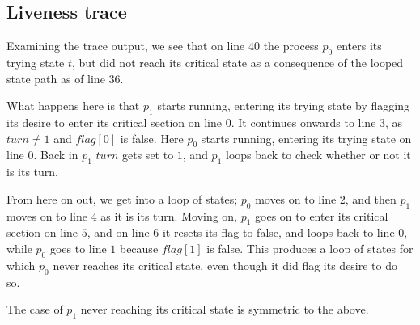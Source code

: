 \documentclass[11pt,a4paper]{article}
\begin{document}
\subsection*{Liveness trace}

Examining the trace output, we see that on line $40$ the process $p_0$ enters
its trying state $t$, but did not reach its critical state as a consequence of
the looped state path as of line $36$.

What happens here is that $p_1$ starts running, entering its trying state by
flagging its desire to enter its critical section on line $0$. It continues
onwards to line $3$, as $turn \neq 1$ and $flag[0]$ is false. Here $p_0$
starts running, entering its trying state on line $0$. Back in $p_1$ $turn$
gets set to $1$, and $p_1$ loops back to check whether or not it is its turn.

From here on out, we get into a loop of states; $p_0$ moves on to line $2$,
and then $p_1$ moves on to line $4$ as it is its turn. Moving on, $p_1$ goes
on to enter its critical section on line $5$, and on line $6$ it resets its
flag to false, and loops back to line $0$, while $p_0$ goes to line $1$
because $flag[1]$ is false. This produces a loop of states for which $p_0$
never reaches its critical state, even though it did flag its desire to do so.

The case of $p_1$ never reaching its critical state is symmetric to the above.
\end{document}
